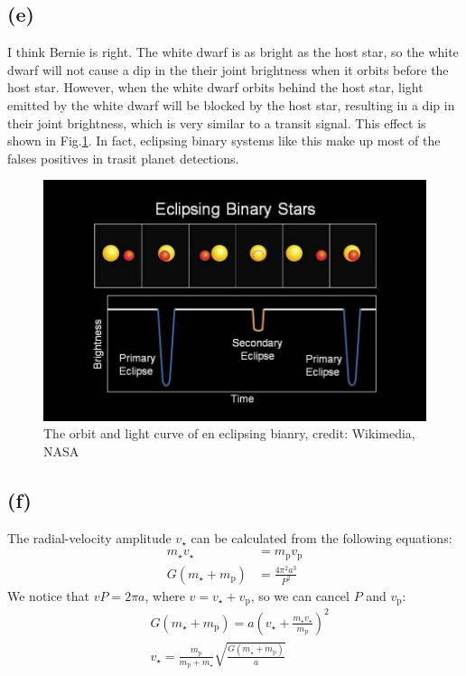 \documentclass[a4paper,12pt]{article}
\begin{document}
\subsection*{(e)}
I think Bernie is right. The white dwarf is as bright as the host star, so 
the white dwarf will not cause a dip in the their joint brightness when it orbits before the host star.
However, when the white dwarf orbits behind the host star, light emitted 
by the white dwarf will be blocked by the host star, resulting in a dip in their 
joint brightness, which is very similar to a transit signal. This effect 
is shown in Fig.\ref{binary}. In fact, eclipsing binary systems like 
this make up most of the falses positives in trasit planet detections.
\begin{figure}[htbp]
    \centering
    \includegraphics[width=12cm]{bianry.jpg}
    \caption{The orbit and light curve of en eclipsing bianry, credit: Wikimedia, NASA}
    \label{binary}
\end{figure}

\subsection*{(f)}
The radial-velocity amplitude $v_{\star}$ can be calculated from the following equations:
\begin{align}
    m_{\star} v_{\star} &= m_\text{p} v_\text{p} \\
    G(m_{\star} + m_\text{p}) &= \frac{4\pi^2 a^3}{P^2}
\end{align}
We notice that $vP = 2\pi a$, where $v = v_{\star}+v_\text{p}$, 
so we can cancel $P$ and $v_\text{p}$:
\begin{align*}
    & G(m_{\star} + m_\text{p}) = a (v_\star + \frac{m_{\star}v_{\star}}{m_\text{p}})^2 \\
    & v_\star = \frac{m_{\text{p}}}{m_{\text{p}}+m_\star} \sqrt{\frac{G(m_{\star} + m_\text{p})}{a}}
\end{align*}
\end{document}
